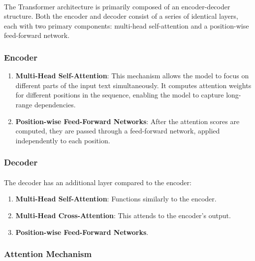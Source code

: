             \paragraph{}The Transformer architecture is primarily composed of an encoder-decoder structure. Both the encoder and decoder consist of a series of identical layers, each with two primary components: multi-head self-attention and a position-wise feed-forward network.
        
        \subsubsection{Encoder}
        
            \begin{enumerate}
                \item \textbf{Multi-Head Self-Attention}: This mechanism allows the model to focus on different parts of the input text simultaneously. It computes attention weights for different positions in the sequence, enabling the model to capture long-range dependencies.
                \item \textbf{Position-wise Feed-Forward Networks}: After the attention scores are computed, they are passed through a feed-forward network, applied independently to each position.
            \end{enumerate}
            
        \subsubsection{Decoder}
            
            \paragraph{}The decoder has an additional layer compared to the encoder:
            \begin{enumerate}
                \item \textbf{Multi-Head Self-Attention}: Functions similarly to the encoder.
                \item \textbf{Multi-Head Cross-Attention}: This attends to the encoder's output.
                \item \textbf{Position-wise Feed-Forward Networks}.
            \end{enumerate}
            
        \subsubsection{Attention Mechanism}
        

